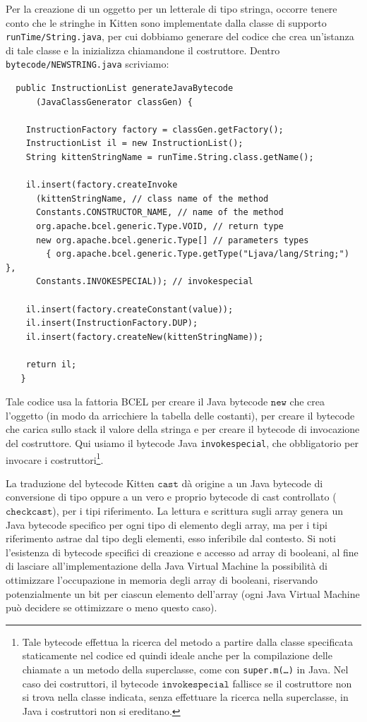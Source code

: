 Per la creazione di un oggetto per un letterale di tipo stringa, occorre tenere
conto che le stringhe in Kitten sono implementate dalla classe di supporto
\texttt{runTime/String.java}, per cui
dobbiamo generare del codice che crea un'istanza di tale classe e la inizializza chiamandone
il costruttore. Dentro \texttt{bytecode/NEWSTRING.java} scriviamo:
%
\begin{verbatim}
  public InstructionList generateJavaBytecode
      (JavaClassGenerator classGen) {

    InstructionFactory factory = classGen.getFactory();
    InstructionList il = new InstructionList();
    String kittenStringName = runTime.String.class.getName();

    il.insert(factory.createInvoke
      (kittenStringName, // class name of the method
      Constants.CONSTRUCTOR_NAME, // name of the method
      org.apache.bcel.generic.Type.VOID, // return type
      new org.apache.bcel.generic.Type[] // parameters types
        { org.apache.bcel.generic.Type.getType("Ljava/lang/String;") },
      Constants.INVOKESPECIAL)); // invokespecial

    il.insert(factory.createConstant(value));
    il.insert(InstructionFactory.DUP);
    il.insert(factory.createNew(kittenStringName));

    return il;
   }
\end{verbatim}
%
Tale codice usa la fattoria BCEL per creare il Java bytecode $\mathtt{new}$ che
crea l'oggetto (in modo da arricchiere la tabella delle costanti),
per creare il bytecode che carica sullo stack il valore della stringa e
per creare il bytecode di invocazione del costruttore. Qui usiamo
il bytecode Java \texttt{invokespecial}, che \e obbligatorio per
invocare i costruttori\footnote{Tale bytecode effettua la ricerca del metodo
a partire dalla classe specificata staticamente nel codice ed \e quindi
ideale anche per la compilazione delle chiamate a un metodo della superclasse,
come con \texttt{super.m(\ldots)} in Java. Nel caso dei costruttori, il
bytecode $\mathtt{invokespecial}$ fallisce se il costruttore non si trova nella classe
indicata, senza effettuare la ricerca nella superclasse, \poiche in Java i
costruttori non si ereditano.}.

La traduzione del bytecode Kitten $\mathtt{cast}$ d\`a origine a un Java bytecode di
conversione di tipo oppure a un vero e proprio bytecode di cast controllato ($\mathtt{checkcast}$),
per i tipi riferimento. La lettura e scrittura sugli array genera un Java bytecode
specifico per ogni tipo di elemento degli array, ma per i tipi riferimento astrae dal
tipo degli elementi, \poiche esso \e inferibile dal contesto. Si noti l'esistenza di bytecode
specifici di creazione e accesso ad array di booleani, al fine di lasciare all'implementazione
della Java Virtual Machine la possibilit\`a di ottimizzare l'occupazione in memoria
degli array di booleani, riservando potenzialmente un bit per ciascun elemento dell'array
(ogni Java Virtual Machine pu\`o decidere se ottimizzare o meno questo caso).

